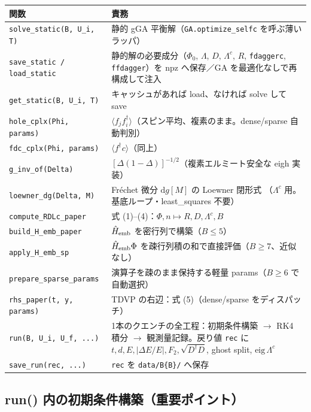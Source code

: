 \documentclass[11pt]{ltjsarticle}
\newcommand{\code}[1]{\texttt{#1}}
\begin{document}
\begin{longtable}{p{}p{}}
\toprule
関数 & 責務 \\
\midrule
\code{solve\_static(B, U\_i, T)} & 静的 gGA 平衡解（\code{GA.optimize\_selfc} を呼ぶ薄いラッパ） \\
\code{save\_static / load\_static} & 静的解の必要成分（$\Phi_0$, $\Lambda$, $D$, $\Lambda^c$, $R$,
\code{fdaggerc}, \code{ffdagger}）を npz へ保存／GA を最適化なしで再構成して注入 \\
\code{get\_static(B, U\_i, T)} & キャッシュがあれば load、なければ solve して save \\
\midrule
\code{hole\_cplx(Phi, params)} & $\langle f_j f_i^\dagger\rangle$（スピン平均、複素のまま。dense/sparse 自動判別） \\
\code{fdc\_cplx(Phi, params)} & $\langle f^\dagger c\rangle$（同上） \\
\code{g\_inv\_of(Delta)} & $[\Delta(1-\Delta)]^{-1/2}$（複素エルミート安全な eigh 実装） \\
\code{loewner\_dg(Delta, M)} & Fr\'echet 微分 $\mathrm{d}g[M]$ の Loewner 閉形式
（$\Lambda^c$ 用。基底ループ・least\_squares 不要） \\
\code{compute\_RDLc\_paper} & 式 (1)--(4)：$\Phi, n \mapsto R, D, \Lambda^c, B$ \\
\code{build\_H\_emb\_paper} & $\hat H_{\rm emb}$ を密行列で構築（$B\le 5$） \\
\code{apply\_H\_emb\_sp} & $\hat H_{\rm emb}\Phi$ を疎行列積の和で直接評価（$B\ge 7$、近似なし） \\
\code{prepare\_sparse\_params} & 演算子を疎のまま保持する軽量 params（$B\ge 6$ で自動選択） \\
\code{rhs\_paper(t, y, params)} & TDVP の右辺：式 (5)（dense/sparse をディスパッチ） \\
\midrule
\code{run(B, U\_i, U\_f, ...)} & 1本のクエンチの全工程：初期条件構築 $\to$ RK4 積分
$\to$ 観測量記録。戻り値 \code{rec} に $t, d, E, |\Delta E/E|, F_2,
\sqrt{D^\dagger D}$, ghost split, $\mathrm{eig}\,\Lambda^c$ \\
\code{save\_run(rec, ...)} & \code{rec} を \code{data/B\{B\}/} へ保存 \\
\bottomrule
\end{longtable}

\subsection*{run() 内の初期条件構築（重要ポイント）}
\end{document}
